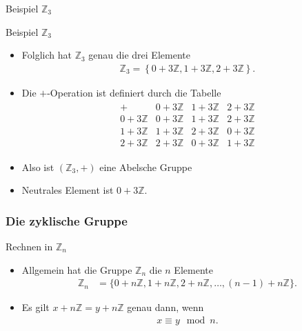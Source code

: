 \documentclass{beamer}
\newcommand\ZZ{\mathbb Z}
\newcommand\cbc[1]{\left\{{#1}\right\}}
\begin{document}
\begin{frame}
\begin{overprint}
\begin{block}{Beispiel $\ZZ_3$}
\begin{itemize}
			\end{itemize}
		\end{block}
		\begin{block}{Beispiel $\ZZ_3$}
			\begin{itemize}
				\item Folglich hat $\ZZ_3$ genau die drei Elemente
					\begin{align*}
						\ZZ_3=\cbc{0+3\ZZ,1+3\ZZ,2+3\ZZ}.
					\end{align*}
				\item Die $+$-Operation ist definiert durch die Tabelle
					\begin{align*}
						\begin{array}{c|c|c|c}
							+&0+3\ZZ&1+3\ZZ&2+3\ZZ\\\hline
							0+3\ZZ&0+3\ZZ&1+3\ZZ&2+3\ZZ\\\hline
							1+3\ZZ&1+3\ZZ&2+3\ZZ&0+3\ZZ\\\hline
							2+3\ZZ&2+3\ZZ&0+3\ZZ&1+3\ZZ
						\end{array}	
					\end{align*}
				\item Also ist $(\ZZ_3,+)$ eine Abelsche Gruppe
				\item Neutrales Element ist $0+3\ZZ$.
			\end{itemize}
		\end{block}
	\end{overprint}
\end{frame}


\begin{frame}\frametitle{Die zyklische Gruppe}
	\begin{block}{Rechnen in $\ZZ_n$}
		\begin{itemize}
			\item Allgemein hat die Gruppe $\ZZ_n$ die $n$ Elemente
				\begin{align*}
					\ZZ_n&=\{0+n\ZZ,1+n\ZZ,2+n\ZZ,\ldots,(n-1)+n\ZZ\}.
				\end{align*}
			\item Es gilt $x+n\ZZ=y+n\ZZ$ genau dann, wenn
				\begin{align*}
					x\equiv y\mod n.
				\end{align*}
		\end{itemize}
	\end{block}
\end{frame}
\end{document}
